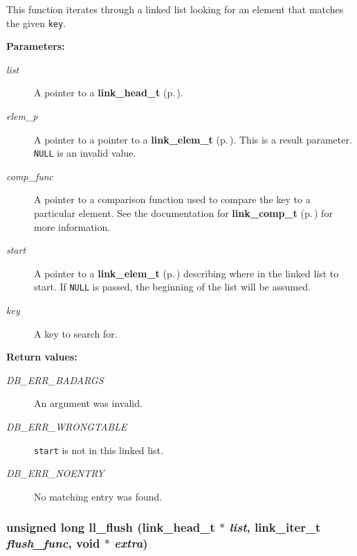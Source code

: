  This function iterates through a linked list looking for an element that matches the given {\tt key}.\begin{Desc}
\item[{\bf Parameters: }]\par
\begin{description}
\item[
{\em list}]A pointer to a {\bf link\_\-head\_\-t} {\rm (p.\,\pageref{group__dbprim__link_a0})}. \item[
{\em elem\_\-p}]A pointer to a pointer to a {\bf link\_\-elem\_\-t} {\rm (p.\,\pageref{group__dbprim__link_a1})}. This is a result parameter. {\tt NULL} is an invalid value. \item[
{\em comp\_\-func}]A pointer to a comparison function used to compare the key to a particular element. See the documentation for {\bf link\_\-comp\_\-t} {\rm (p.\,\pageref{group__dbprim__link_a3})} for more information. \item[
{\em start}]A pointer to a {\bf link\_\-elem\_\-t} {\rm (p.\,\pageref{group__dbprim__link_a1})} describing where in the linked list to start. If {\tt NULL} is passed, the beginning of the list will be assumed. \item[
{\em key}]A key to search for.\end{description}
\end{Desc}
\begin{Desc}
\item[{\bf Return values: }]\par
\begin{description}
\item[
{\em DB\_\-ERR\_\-BADARGS}]An argument was invalid. \item[
{\em DB\_\-ERR\_\-WRONGTABLE}]{\tt start} is not in this linked list. \item[
{\em DB\_\-ERR\_\-NOENTRY}]No matching entry was found. \end{description}
\end{Desc}
\subsubsection{\setlength{\rightskip}{0pt plus 5cm}unsigned long ll\_\-flush ({\bf link\_\-head\_\-t} $\ast$ {\em list}, {\bf link\_\-iter\_\-t} {\em flush\_\-func}, void $\ast$ {\em extra})}\label{group__dbprim__link_a11}




